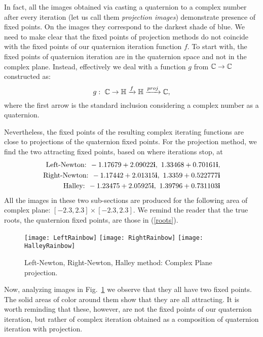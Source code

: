 \documentclass{article}
\theoremstyle{definition}
\begin{document}
In fact, all the images obtained via casting a quaternion to a complex number after every iteration (let us call them {\it projection images}) demonstrate presence of fixed points. On the images they correspond to the darkest shade of blue. We need to make clear that the fixed points of projection methods do not coincide with the fixed points of our quaternion iteration function $f$. To start with, the fixed points of quaternion iteration are in the quaternion space and not in the complex plane.
Instead, effectively we deal with a function $g$ from ${\mathbb C} \to {\mathbb C}$ constructed as:
\begin{equation}
g:\ {\mathbb C} \to {\mathbb H} \xrightarrow{f} {\mathbb H} \xrightarrow{proj} {\mathbb C} ,
\end{equation}
where the first arrow is the standard inclusion considering  a complex number as a quaternion.

Nevertheless, the fixed points of the resulting complex iterating functions are close to projections of the quaternion fixed points.
For the projection method, we find the two attracting fixed points, based on where iterations stop, at
\begin{eqnarray*}
\mbox{Left-Newton: }-1.17679+ 2.09022 {\bf i},\ 1.33468+ 0.70161 {\bf i},\\
\mbox{Right-Newton: }-1.17442+ 2.01315 {\bf i},\ 1.3359+ 0.522777 {\bf i} \\
\mbox{Halley: }-1.23475+ 2.05925 {\bf i},\ 1.39796+0.731103 {\bf i}
\end{eqnarray*}
All the images in these two sub-sections are produced for the following area of complex plane: $[-2.3,2.3]\times [-2.3,2.3]$. We remind the reader that the true roots, the quaternion fixed points, are  those in (\ref{roots}).

\begin{figure}
\begin{center}
\texttt{[image: LeftRainbow]}
\texttt{[image: RightRainbow]}
\texttt{[image: HalleyRainbow]}
\caption{Left-Newton, Right-Newton, Halley method: Complex Plane projection.}
\label{leftComplexProjection}
\end{center}
\end{figure}
Now, analyzing images in Fig.~\ref{leftComplexProjection} we observe that they all have two fixed points. The solid areas of color around them show that they are all attracting. It is worth reminding that these, however, are not the fixed points of our quaternion iteration, but rather of complex iteration obtained as a composition of quaternion iteration with projection.
\end{document}
